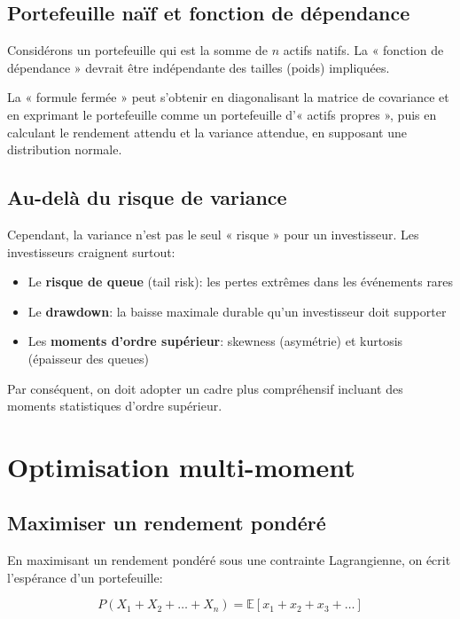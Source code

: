 \documentclass[11pt,a4paper]{article}
\begin{document}
\subsection{Portefeuille naïf et fonction de dépendance}

Considérons un portefeuille qui est la somme de $n$ actifs natifs. La « fonction de dépendance » devrait être indépendante des tailles (poids) impliquées.

La « formule fermée » peut s'obtenir en diagonalisant la matrice de covariance et en exprimant le portefeuille comme un portefeuille d'« actifs propres », puis en calculant le rendement attendu et la variance attendue, en supposant une distribution normale.

\subsection{Au-delà du risque de variance}

Cependant, la variance n'est pas le seul « risque » pour un investisseur. Les investisseurs craignent surtout:

\begin{itemize}
\item Le \textbf{risque de queue} (tail risk): les pertes extrêmes dans les événements rares
\item Le \textbf{drawdown}: la baisse maximale durable qu'un investisseur doit supporter
\item Les \textbf{moments d'ordre supérieur}: skewness (asymétrie) et kurtosis (épaisseur des queues)
\end{itemize}

Par conséquent, on doit adopter un cadre plus compréhensif incluant des moments statistiques d'ordre supérieur.

\section{Optimisation multi-moment}

\subsection{Maximiser un rendement pondéré}

En maximisant un rendement pondéré sous une contrainte Lagrangienne, on écrit l'espérance d'un portefeuille:

\[
P(X_1 + X_2 + \ldots + X_n) = \mathbb{E}[x_1 + x_2 + x_3 + \ldots]
\]
\end{document}
